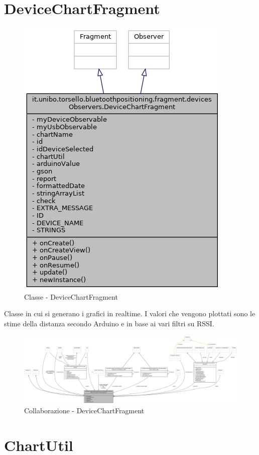 \section{DeviceChartFragment}
\begin{figure}[ph]
	\centering
	\includegraphics[width=0.5\linewidth]{img/uml/class/classit_1_1unibo_1_1torsello_1_1bluetoothpositioning_1_1fragment_1_1devicesObservers_1_1DeviceChartFragment__inherit__graph.png}
	\caption{Classe - DeviceChartFragment}
\end{figure}

Classe in cui si generano i grafici in realtime. I valori che vengono plottati sono le stime della distanza secondo Arduino e in base ai vari filtri su RSSI.

\begin{figure}[ph]
	\centering
	\includegraphics[width=1.8\linewidth,angle=90]{img/uml/class/classit_1_1unibo_1_1torsello_1_1bluetoothpositioning_1_1fragment_1_1devicesObservers_1_1DeviceChartFragment__coll__graph.png}
	\caption{Collaborazione - DeviceChartFragment}
\end{figure}

\newpage
\section{ChartUtil}

